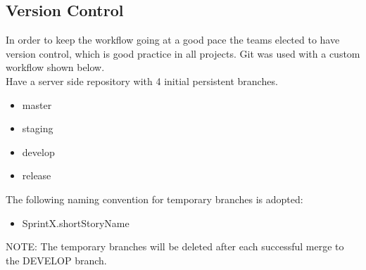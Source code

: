 \subsection{Version Control}
\label{sec:git}

In order to keep the workflow going at a good pace the teams elected to have version control, which is good practice in all projects. Git was used with a custom workflow shown below. \\

Have a server side repository with 4 initial persistent branches.
\begin{itemize}
\item master
\item staging
\item develop
\item release
\end{itemize}

The following naming convention for temporary branches is adopted: 

\begin{itemize}
\item SprintX.shortStoryName
\end{itemize}

NOTE: The temporary branches will be deleted after each successful merge to the DEVELOP branch.

